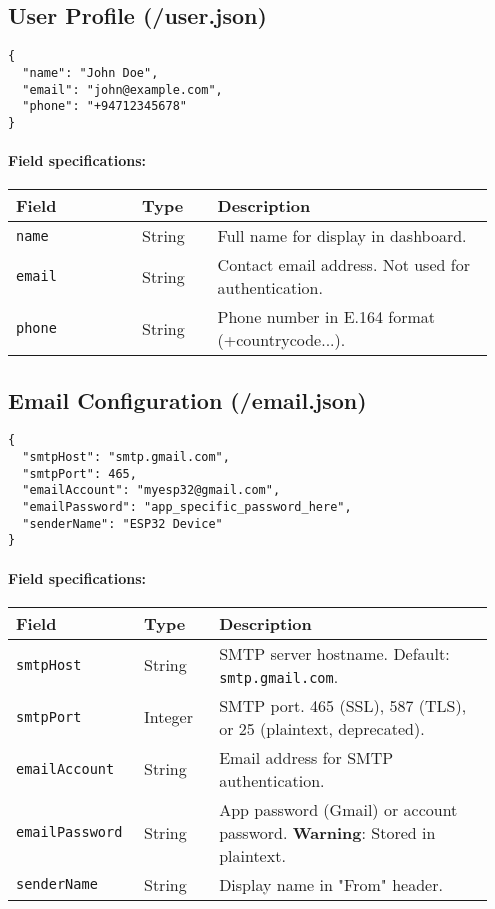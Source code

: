 \documentclass[11pt,a4paper]{article}
\begin{document}
\subsection{User Profile (/user.json)}

\begin{verbatim}
{
  "name": "John Doe",
  "email": "john@example.com",
  "phone": "+94712345678"
}
\end{verbatim}

\paragraph{Field specifications:}
\begin{longtable}{>{\raggedright\arraybackslash}p{0.25\linewidth} p{0.15\linewidth} p{0.55\linewidth}}
\hline
\textbf{Field} & \textbf{Type} & \textbf{Description} \\
\hline
\endhead
\texttt{name} & String & Full name for display in dashboard. \\
\texttt{email} & String & Contact email address. Not used for authentication. \\
\texttt{phone} & String & Phone number in E.164 format (+countrycode...). \\
\hline
\end{longtable}

\subsection{Email Configuration (/email.json)}

\begin{verbatim}
{
  "smtpHost": "smtp.gmail.com",
  "smtpPort": 465,
  "emailAccount": "myesp32@gmail.com",
  "emailPassword": "app_specific_password_here",
  "senderName": "ESP32 Device"
}
\end{verbatim}

\paragraph{Field specifications:}
\begin{longtable}{>{\raggedright\arraybackslash}p{0.25\linewidth} p{0.15\linewidth} p{0.55\linewidth}}
\hline
\textbf{Field} & \textbf{Type} & \textbf{Description} \\
\hline
\endhead
\texttt{smtpHost} & String & SMTP server hostname. Default: \texttt{smtp.gmail.com}. \\
\texttt{smtpPort} & Integer & SMTP port. 465 (SSL), 587 (TLS), or 25 (plaintext, deprecated). \\
\texttt{emailAccount} & String & Email address for SMTP authentication. \\
\texttt{emailPassword} & String & App password (Gmail) or account password. \textbf{Warning}: Stored in plaintext. \\
\texttt{senderName} & String & Display name in "From" header. \\
\hline
\end{longtable}
\end{document}

